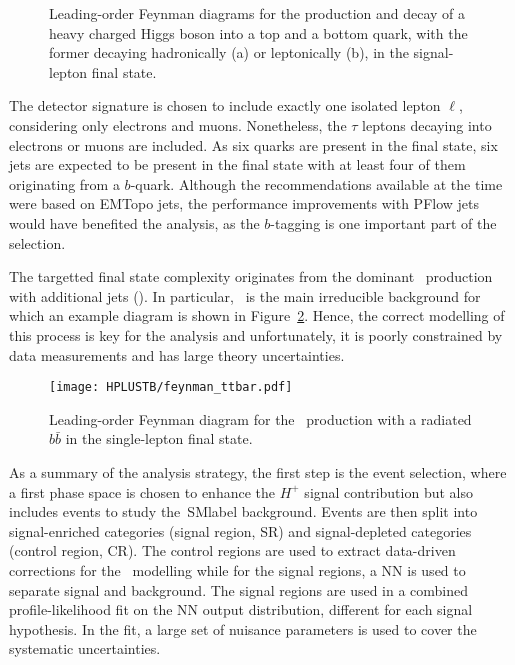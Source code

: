 \begin{figure}[htbp]
    \RawFloats
    \begin{center}
     \quad
    \caption{
        Leading-order Feynman diagrams for the production and decay of a heavy charged Higgs boson into a top and a bottom quark, with the former decaying hadronically (a) or leptonically (b), in the signal-lepton final state.
    }
    \label{Hplustb:feynman2}
    \end{center}
\end{figure}

The detector signature is chosen to include exactly one isolated lepton $\ell$, considering only electrons and muons. Nonetheless, the $\tau$ leptons decaying into electrons or muons are included. As six quarks are present in the final state, six jets are expected to be present in the final state with at least four of them originating from a $b$-quark. Although the recommendations available at the time were based on EMTopo jets, the performance improvements with PFlow jets would have benefited the analysis, as the $b$-tagging is one important part of the selection.

The targetted final state complexity originates from the dominant \ttbar\ production with additional jets (\ttjets). In particular, \ttb\ is the main irreducible background for which an example diagram is shown in Figure~\ref{Hplustb:feynman3}. Hence, the correct modelling of this process is key for the analysis and unfortunately, it is poorly constrained by data measurements and has large theory uncertainties. 


\begin{figure}[htbp]
    \RawFloats
    \begin{center}
    \texttt{[image: HPLUSTB/feynman\_ttbar.pdf]}
    \caption{
        Leading-order Feynman diagram for the \ttbar\ production with a radiated $b\bar{b}$ in the single-lepton final state.
    }
    \label{Hplustb:feynman3}
    \end{center}
\end{figure}

As a summary of the analysis strategy, the first step is the event selection, where a first phase space is chosen to enhance the $H^+$ signal contribution but also includes events to study the~\acrshort{SMlabel} background. Events are then split into signal-enriched categories (signal region, SR) and signal-depleted categories (control region, CR). The control regions are used to extract data-driven corrections for the \ttbar\ modelling while for the signal regions, a NN is used to separate signal and background. The signal regions are used in a combined profile-likelihood fit on the NN output distribution, different for each signal hypothesis. In the fit, a large set of nuisance parameters is used to cover the systematic uncertainties.

